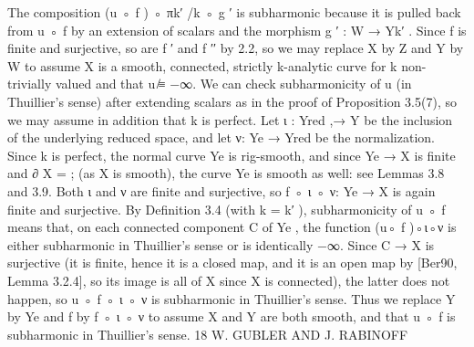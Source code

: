 \documentclass[
  10pt,
]{article}
\newenvironment{Shaded}{}{}
\newcommand{\NormalTok}[1]{#1}
\begin{document}
\begin{Shaded}
\begin{Highlighting}[]
\NormalTok{The composition (u ◦ f ) ◦ πk′ /k ◦ g ′ is subharmonic because it is pulled back from u ◦ f by}
\NormalTok{an extension of scalars and the morphism g ′ : W → Yk′ . Since f is finite and surjective,}
\NormalTok{so are f ′ and f ′′ by 2.2, so we may replace X by Z and Y by W to assume X is a smooth,}
\NormalTok{connected, strictly k{-}analytic curve for k non{-}trivially valued and that u ̸≡ −∞. We can}
\NormalTok{check subharmonicity of u (in Thuillier’s sense) after extending scalars as in the proof of}
\NormalTok{Proposition 3.5(7), so we may assume in addition that k is perfect.}
\NormalTok{   Let ι : Yred ,→ Y be the inclusion of the underlying reduced space, and let ν: Ye → Yred be}
\NormalTok{the normalization. Since k is perfect, the normal curve Ye is rig{-}smooth, and since Ye → X}
\NormalTok{is finite and ∂ X = ; (as X is smooth), the curve Ye is smooth as well: see Lemmas 3.8}
\NormalTok{and 3.9. Both ι and ν are finite and surjective, so f ◦ ι ◦ ν: Ye → X is again finite and}
\NormalTok{surjective. By Definition 3.4 (with k = k′ ), subharmonicity of u ◦ f means that, on each}
\NormalTok{connected component C of Ye , the function (u◦ f )◦ι◦ν is either subharmonic in Thuillier’s}
\NormalTok{sense or is identically −∞. Since C → X is surjective (it is finite, hence it is a closed}
\NormalTok{map, and it is an open map by [Ber90, Lemma 3.2.4], so its image is all of X since X is}
\NormalTok{connected), the latter does not happen, so u ◦ f ◦ ι ◦ ν is subharmonic in Thuillier’s sense.}
\NormalTok{Thus we replace Y by Ye and f by f ◦ ι ◦ ν to assume X and Y are both smooth, and that}
\NormalTok{u ◦ f is subharmonic in Thuillier’s sense.}
\NormalTok{18                                W. GUBLER AND J. RABINOFF}


\end{Highlighting}
\end{Shaded}
\end{document}
